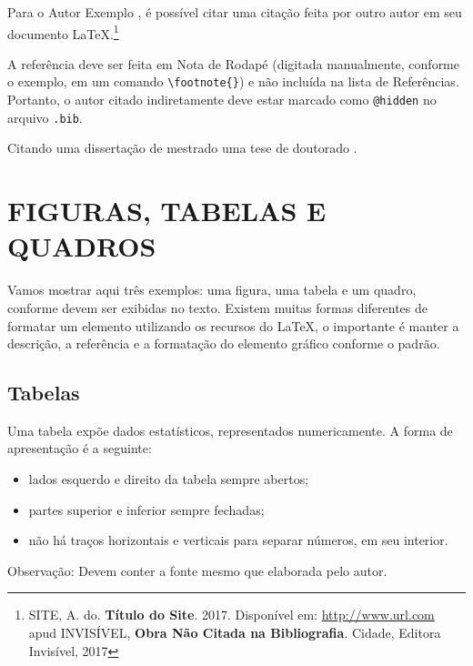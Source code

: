 \documentclass[
  12pt,		%
  a4paper,	%
  openright,%
  oneside,	%
  chapter=TITLE,		%
  section=TITLE,		%
  english,	%
  french,	%
  spanish,	%
  brazil
]{abntex2}
\begin{document}
            Para o Autor Exemplo , é possível citar uma citação feita por outro autor em seu documento \LaTeX.\footnote{SITE, A. do. \textbf{Título do Site}. 2017. Disponível em: \url{http://www.url.com} apud INVISÍVEL, \textbf{Obra Não Citada na Bibliografia}. Cidade, Editora Invisível, 2017}
            
            A referência deve ser feita em Nota de Rodapé (digitada manualmente, conforme o exemplo, em um comando \verb|\footnote{}|) e não incluída na lista de Referências. Portanto, o autor citado indiretamente deve estar marcado como \verb|@hidden| no arquivo \verb|.bib|. 
            
            Citando uma dissertação de mestrado \cite{araujo1986} uma tese de doutorado \cite{teseDoutorado}.
             
        \section{FIGURAS, TABELAS E QUADROS}
        
            Vamos mostrar aqui três exemplos: uma figura, uma tabela e um quadro, conforme devem ser exibidas no texto. Existem muitas formas diferentes de formatar um elemento utilizando os recursos do \LaTeX, o importante é manter a descrição, a referência e a formatação do elemento gráfico conforme o padrão.
            
            \subsection {Tabelas}
                Uma tabela expõe dados estatísticos, representados numericamente. A forma de apresentação é a seguinte: 
                \begin{itemize}
                    \item lados esquerdo e direito da tabela sempre abertos;
                    \item partes superior e inferior sempre fechadas;
                    \item não há traços horizontais e verticais para separar números, em seu interior.
                \end{itemize}
                
                Observação: Devem conter a fonte mesmo que elaborada pelo autor.
                
\end{document}
